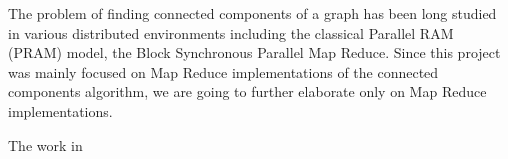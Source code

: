 The problem of finding connected components of a graph has been long studied in various distributed environments including the classical Parallel RAM (PRAM) model, the Block Synchronous Parallel Map Reduce. Since this project was mainly focused on Map Reduce implementations of the connected components algorithm, we are going to further elaborate only on Map Reduce implementations.

The work in \cite{rastogi}

\cite{kiveris}